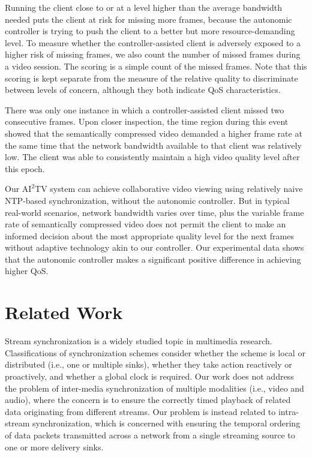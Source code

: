 \documentclass{sig-alternate}
\begin{document}

Running the client close to or at a level higher than the average
bandwidth needed puts the client at risk for missing more frames,
because the autonomic controller is trying to push the client to a
better but more resource-demanding level.  To measure whether the
controller-assisted client is adversely exposed to a higher risk of
missing frames, we also count the number of missed frames during a
video session.  The scoring is a simple count of the missed frames.
Note that this scoring is kept separate from the measure of the
relative quality to discriminate between levels of concern, although
they both indicate QoS characteristics.

There was only one instance in which a controller-assisted client
missed two consecutive frames.  Upon closer inspection, the time
region during this event showed that the semantically compressed video
demanded a higher frame rate at the same time that the network
bandwidth available to that client was relatively low.  The client was
able to consistently maintain a high video quality level after this
epoch.


Our $\mathrm{AI}^2$TV system can achieve collaborative video viewing
using relatively naive NTP-based synchronization, without the
autonomic controller. But in typical real-world scenarios, network
bandwidth varies over time, plus the variable frame rate of
semantically compressed video does not permit the client to make an
informed decision about the most appropriate quality level for the
next frames without adaptive technology akin to our controller.  Our
experimental data shows that the autonomic controller makes a
significant positive difference in achieving higher QoS.

\section{Related Work} \label{related}

Stream synchronization is a widely studied topic in multimedia
research. Classifications of synchronization schemes consider whether
the scheme is local or distributed (i.e., one or multiple sinks),
whether they take action reactively or proactively, and whether a
global clock is required.  Our work does not address the problem of
inter-media synchronization of multiple modalities (i.e., video and
audio), where the concern is to ensure the correctly timed playback of
related data originating from different streams.  Our problem is
instead related to intra-stream synchronization, which is concerned
with ensuring the temporal ordering of data packets transmitted across
a network from a single streaming source to one or more delivery sinks.
\end{document}
